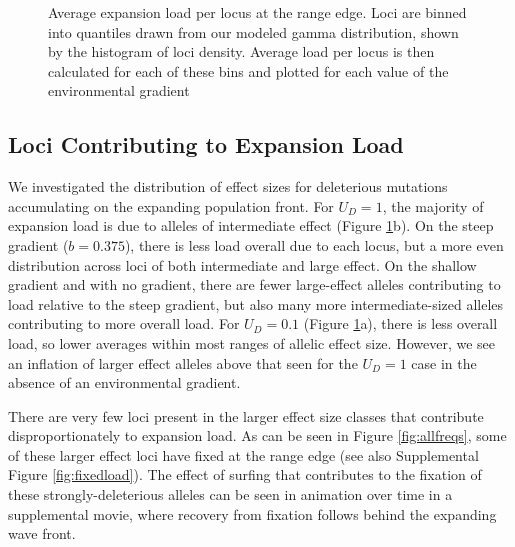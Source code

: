 \begin{figure}[!ht]
\centering
{}
\caption[~- Average expansion load per locus.]{Average expansion load per locus at the range edge. Loci are binned into quantiles drawn from our modeled gamma distribution, shown by the histogram of loci density. Average load per locus is then calculated for each of these bins and plotted for each value of the environmental gradient}
\label{fig:loci}
\end{figure}

\subsection{Loci Contributing to Expansion Load}
We investigated the distribution of effect sizes for deleterious mutations accumulating on the expanding population front. For $U_D = 1$, the majority of expansion load is due to alleles of intermediate effect (Figure \ref{fig:loci}b). On the steep gradient ($b = 0.375$), there is less load overall due to each locus, but a more even distribution across loci of both intermediate and large effect. On the shallow gradient and with no gradient, there are fewer large-effect alleles contributing to load relative to the steep gradient, but also many more intermediate-sized alleles contributing to more overall load. For $U_D = 0.1$ (Figure \ref{fig:loci}a), there is less overall load, so lower averages within most ranges of allelic effect size. However, we see an inflation of larger effect alleles above that seen for the $U_D= 1$ case in the absence of an environmental gradient.



There are very few loci present in the larger effect size classes that contribute disproportionately to expansion load. As can be seen in Figure \ref{fig:allfreqs}, some of these larger effect loci have fixed at the range edge (see also Supplemental Figure \ref{fig:fixedload}). The effect of surfing that contributes to the fixation of these strongly-deleterious alleles can be seen in animation over time in a supplemental movie, where recovery from fixation follows behind the expanding wave front.


